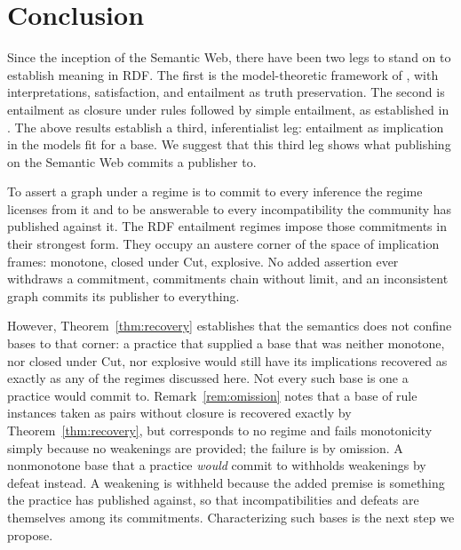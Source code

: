 \documentclass[12pt]{article}
\theoremstyle{definition}
\begin{document}
\section{Conclusion}
\label{sec:discussion}

Since the inception of the Semantic Web, there have been two legs to stand on to establish meaning in RDF. The first is the model-theoretic framework of \citet{hayes2014rdf}, with interpretations, satisfaction, and entailment as truth preservation. The second is entailment as closure under rules followed by simple entailment, as established in \citet{terhorst2005completeness}. The above results establish a third, inferentialist leg: entailment as implication in the models fit for a base. We suggest that this third leg shows what publishing on the Semantic Web commits a publisher to.

To assert a graph under a regime is to commit to every inference the regime licenses from it and to be answerable to every incompatibility the community has published against it. The RDF entailment regimes impose those commitments in their strongest form. They occupy an austere corner of the space of implication frames: monotone, closed under Cut, explosive. No added assertion ever withdraws a commitment, commitments chain without limit, and an inconsistent graph commits its publisher to everything.

However, Theorem~\ref{thm:recovery} establishes that the semantics does not confine bases to that corner: a practice that supplied a base that was neither monotone, nor closed under Cut, nor explosive would still have its implications recovered as exactly as any of the regimes discussed here. Not every such base is one a practice would commit to. Remark~\ref{rem:omission} notes that a base of rule instances taken as pairs without closure is recovered exactly by Theorem~\ref{thm:recovery}, but corresponds to no regime and fails monotonicity simply because no weakenings are provided; the failure is by omission. A nonmonotone base that a practice \textit{would} commit to withholds weakenings by defeat instead. A weakening is withheld because the added premise is something the practice has published against, so that incompatibilities and defeats are themselves among its commitments. Characterizing such bases is the next step we propose.
\end{document}
